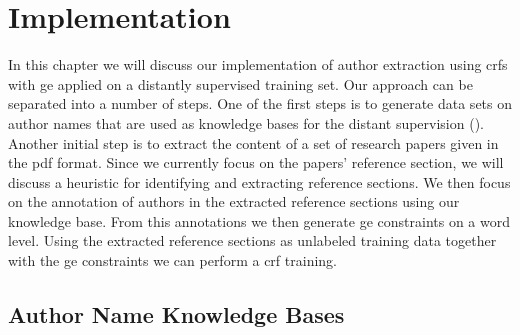 \chapter{Implementation}\label{cha:implementation}

In this chapter we will discuss our implementation of author extraction using \glspl{crf} with \gls{ge} applied on a distantly supervised training set.
Our approach can be separated into a number of steps.
One of the first steps is to generate data sets on author names that are used as knowledge bases for the \gls{distant supervision} ().
Another initial step is to extract the content of a set of research papers given in the \gls{pdf} format.
Since we currently focus on the papers' reference section, we will discuss a heuristic for identifying and extracting reference sections.
We then focus on the annotation of authors in the extracted reference sections using our knowledge base.
From this annotations we then generate \gls{ge} constraints on a word level.
Using the extracted reference sections as unlabeled training data together with the \gls{ge} constraints we can perform a \gls{crf} training.

\section{Author Name Knowledge Bases}\label{sec:knowldge-bases}


